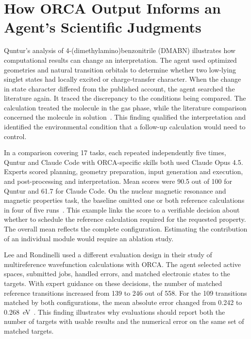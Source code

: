 \documentclass[a4paper,11pt]{article}
\begin{document}
\section{How ORCA Output Informs an Agent's Scientific Judgments}
Quntur's analysis of 4-(dimethylamino)benzonitrile (DMABN) illustrates how
computational results can change an interpretation.
The agent used optimized geometries and natural transition orbitals to determine
whether two low-lying singlet states had locally excited or charge-transfer
character.
When the change in state character differed from the published account, the
agent searched the literature again.
It traced the discrepancy to the conditions being compared.
The calculation treated the molecule in the gas phase, while the literature
comparison concerned the molecule in solution~\cite{quntur}.
This finding qualified the interpretation and identified the environmental
condition that a follow-up calculation would need to control.

In a comparison covering 17 tasks, each repeated independently five times,
Quntur and Claude Code with ORCA-specific skills both used Claude Opus 4.5.
Experts scored planning, geometry preparation, input generation and execution,
and post-processing and interpretation.
Mean scores were 90.5 out of 100 for Quntur and 61.7 for Claude Code.
On the nuclear magnetic resonance and magnetic properties task, the baseline
omitted one or both reference calculations in four of five runs~\cite{quntur}.
This example links the score to a verifiable decision about whether to schedule
the reference calculation required for the requested property.
The overall mean reflects the complete configuration.
Estimating the contribution of an individual module would require an ablation
study.

Lee and Rondinelli used a different evaluation design in their study of
multireference wavefunction calculations with ORCA.
The agent selected active spaces, submitted jobs, handled errors, and matched
electronic states to the targets.
With expert guidance on these decisions, the number of matched reference
transitions increased from 139 to 246 out of 558.
For the 109 transitions matched by both configurations, the mean absolute
error changed from 0.242 to 0.268~eV~\cite{mr}.
This finding illustrates why evaluations should report both the number of
targets with usable results and the numerical error on the same set of
matched targets.
\end{document}
